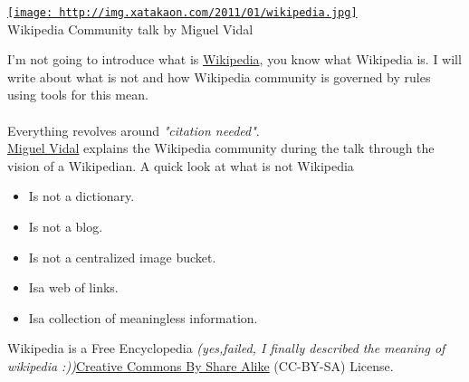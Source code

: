 
\begin{tabular}\href{http://img.xatakaon.com/2011/01/wikipedia.jpg}{
\texttt{[image: http://img.xatakaon.com/2011/01/wikipedia.jpg]}} \\ 
Wikipedia Community talk by Miguel Vidal
\end{tabular} I'm not going to introduce what is \href{http://www.wikipedia.org/}{Wikipedia}, you know what Wikipedia is. I will write about what is not and how Wikipedia community is governed by rules using tools for this mean.
\\
\\ Everything revolves around \textit{"citation needed"}\nolinebreakquotation.
\\\href{http://gsyc.urjc.es/~mvidal/}{Miguel Vidal} explains the Wikipedia community during the talk through the vision of a Wikipedian. A quick look at what is not Wikipedia
\\
\begin{itemize}
	\item Is not a dictionary.
	\item Is not a blog.
	\item Is not a centralized image bucket.
	\item Is\nolinebreaknot a web of links.
	\item Is\nolinebreaknot a collection of meaningless information.
\end{itemize} Wikipedia is a Free Encyclopedia \textit{(yes,\nolinebreakI failed, I finally described the meaning of wikipedia :))}\nolinebreakwith \href{http://creativecommons.org/licenses/by-sa/3.0/}{Creative Commons By Share Alike} (CC-BY-SA) License.

